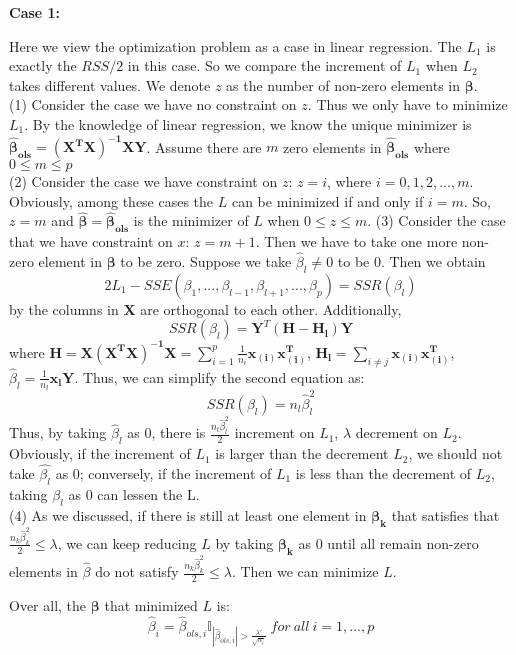 \documentclass{article}
\begin{document}
\begin{appendices}
	\textbf{Case 1:}\par 
	 Here we view the optimization problem as a case in linear regression. 
	The $L_1$ is exactly the $RSS/2$ in this case. So we compare the increment of $L_1$  when $L_2$ takes different values. We denote $z$ as the number of  non-zero elements in $\bm{\beta}$.\\
	(1) Consider the case we have no constraint on $z$. Thus we only have to minimize $L_1$. By the knowledge of linear regression, we know the unique minimizer is $\bm{\hat{\beta}_{ols}}=\mathbf{(X^TX)^{-1}XY}$. Assume there are $m$ zero elements in $\bm{\hat{\beta}_{ols}}$ where $0\leq m \leq p$ \\
	(2) Consider the case we have constraint on $z$: $z = i$, where $i=0,1,2,...,m$. Obviously, among these cases the $L$ can be minimized if and only if $i=m$. So, $z=m$ and $\bm{\hat{\beta}}=\bm{\hat{\beta}_{ols}}$ is the minimizer of $L$ when $0\leq z\leq m$.
	(3) Consider the case that we have constraint on $x$: $z=m+1$. Then we have to take one more non-zero element in $\bm{\beta}$ to be zero. Suppose we take $\hat{\beta}_l \neq 0$ to be 0. Then we obtain 
	\begin{equation*}
		2L_1 -SSE(\beta_1,...,\beta_{l-1},\beta_{l+1},...,\beta_p)=SSR(\beta_l)
	\end{equation*}
	by the columns in $\mathbf{X}$ are orthogonal to each other. Additionally,
	\begin{equation*}
		SSR(\beta_l) = \mathbf{Y}^T(\mathbf{H-H_l})\mathbf{Y} 
	\end{equation*}
	where $\mathbf{H=X(X^TX)^{-1}X}=\sum_{i=1}^p\frac{1}{n_i}\mathbf{x_{(i)}x_{(i)}^T}$, $\mathbf{H_l} = \sum_{i\neq j}\mathbf{x_{(i)}x_{(i)}^T}$, $\hat{\beta}_l = \frac{1}{n_l}\mathbf{x_{l}Y}$. Thus, we can simplify the second equation as:
	\begin{equation*}
		SSR(\beta_l) = n_l\hat{\beta}_l^2
	\end{equation*}
	Thus, by taking $\hat{\beta}_l$ as 0, there is $\frac{n_l\hat{\beta}_l^2}{2}$ increment on $L_1$, $\lambda$ decrement on $L_2$. Obviously, if the increment of $L_1$ is larger than the decrement $L_2$, we should not take $\hat{\beta_l}$ as 0; conversely, if the increment of $L_1$ is less than the decrement of $L_2$, taking $\hat{\beta_l}$ as 0 can lessen the L.\\
	(4) As we discussed, if there is still at least one element in $\bm{\beta_k}$ that satisfies that $\frac{n_k\hat{\beta}_k^2}{2}\leq\lambda$, we can keep reducing $L$ by taking $\bm{\beta_k}$ as 0 until all remain non-zero elements in $\hat{\beta}$ do not satisfy $\frac{n_k\hat{\beta}_k^2}{2}\leq\lambda$. Then we can minimize $L$.\par 
	Over all, the $\bm{\beta}$ that minimized $L$ is:
	\begin{equation*}
			\hat{\beta}_i = \hat{\beta}_{ols,i}\mathbb{I}_{|\hat{\beta}_{ols,i}|>\frac{\lambda'}{\sqrt{n_i}}}\ for\ all\ i=1,...,p
	\end{equation*}
	

\end{appendices}
\end{document}

